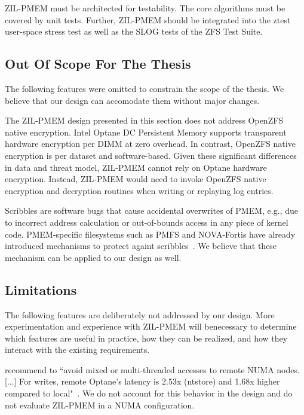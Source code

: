 \documentclass[12pt,a4paper,twoside]{book}
\begin{document}
ZIL-PMEM must be architected for testability.
The core algorithms must be covered by unit tests.
Further, ZIL-PMEM should be integrated into the ztest user-space stress test as well as the SLOG tests of the ZFS Test Suite.

\subsection{Out Of Scope For The Thesis}
The following features were omitted to constrain the scope of the thesis.
We believe that our design can accomodate them without major changes.

The ZIL-PMEM design presented in this section does not address OpenZFS native encryption.
Intel Optane DC Persistent Memory supports transparent hardware encryption per DIMM at zero overhead.
In contrast, OpenZFS native encryption is per dataset and software-based.
Given these significant differences in data and threat model, ZIL-PMEM cannot rely on Optane hardware encryption.
Instead, ZIL-PMEM would need to invoke OpenZFS native encryption and decryption routines when writing or replaying log entries.

Scribbles are software bugs that cause accidental overwrites of PMEM, e.g., due to incorrect address calculation or out-of-bounds access in any piece of kernel code.
PMEM-specific filesystems such as PMFS and NOVA-Fortis have already introduced mechanisms to protect againt scribbles~\cite{dulloorSystemSoftwarePersistent2014,xuNOVAFortisFaulttolerantNonvolatile2017}.
We believe that these mechanism can be applied to our design as well.

\subsection{Limitations}
The following features are deliberately not addressed by our design.
More experimentation and experience with ZIL-PMEM will benecessary to determine which features are useful in practice, how they can be realized, and how they interact with the existing requirements.

\citeauthor{yangEmpiricalGuideBehavior2020} recommend to ``avoid mixed or multi-threaded accesses to remote NUMA nodes. [...]  For writes, remote Optane’s latency is 2.53x (ntstore) and 1.68x higher compared to local"~\cite{yangEmpiricalGuideBehavior2020}.
We do not account for this behavior in the design and do not evaluate ZIL-PMEM in a NUMA configuration.
\end{document}
